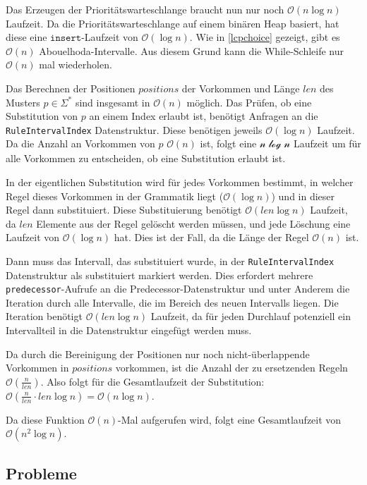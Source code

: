 Das Erzeugen der Prioritätswarteschlange braucht nun nur noch $\mathcal{O}(n \log n)$ Laufzeit. Da die Prioritätswarteschlange auf einem binären Heap basiert, hat diese eine $\texttt{insert}$-Laufzeit von $\mathcal{O}(\log n)$. Wie in \autoref{lcpchoice} gezeigt, gibt es $\mathcal{O}(n)$ Abouelhoda-Intervalle. Aus diesem Grund kann die While-Schleife nur $\mathcal{O}(n)$ mal wiederholen.

Das Berechnen der Positionen $positions$ der Vorkommen und Länge $len$ des Musters $p \in \Sigma^*$ sind insgesamt in $\mathcal{O}(n)$ möglich. 
Das Prüfen, ob eine Substitution von $p$ an einem Index erlaubt ist, benötigt Anfragen an die \texttt{RuleIntervalIndex} Datenstruktur.
Diese benötigen jeweils $\mathcal{O}(\log n)$ Laufzeit. Da die Anzahl an Vorkommen von $p$ $\mathcal{O}(n)$ ist, folgt eine $\mathcal{n \log n}$ Laufzeit um für alle Vorkommen zu entscheiden, ob eine Substitution erlaubt ist.

In der eigentlichen Substitution wird für jedes Vorkommen bestimmt, in welcher Regel dieses Vorkommen in der Grammatik liegt ($\mathcal{O}(\log n)$) und in dieser Regel dann substituiert. Diese Substituierung benötigt $\mathcal{O}(len \log n)$ Laufzeit, da $len$ Elemente aus der Regel gelöscht werden müssen, und jede Löschung eine Laufzeit von $\mathcal{O}(\log n)$ hat. Dies ist der Fall, da die Länge der Regel $\mathcal{O}(n)$ ist.

Dann muss das Intervall, das substituiert wurde, in der \texttt{RuleIntervalIndex} Datenstruktur als substituiert markiert werden.
Dies erfordert mehrere \texttt{predecessor}-Aufrufe an die Predecessor-Datenstruktur und unter Anderem die Iteration durch alle Intervalle, die im Bereich des neuen Intervalls liegen. Die Iteration benötigt $\mathcal{O}(len \log n)$ Laufzeit, da für jeden Durchlauf potenziell ein Intervallteil in die Datenstruktur eingefügt werden muss. 

Da durch die Bereinigung der Positionen nur noch nicht-überlappende Vorkommen in $positions$ vorkommen, ist die Anzahl der zu ersetzenden Regeln $\mathcal{O}(\tfrac{n}{len})$. Also folgt für die Gesamtlaufzeit der Substitution: $\mathcal{O}(\tfrac{n}{len} \cdot len \log n) = \mathcal{O}(n \log n)$.

Da diese Funktion $\mathcal{O}(n)$-Mal aufgerufen wird, folgt eine Gesamtlaufzeit von $\mathcal{O}(n^2 \log n)$.





\subsection{Probleme}
\label{v3problems}

